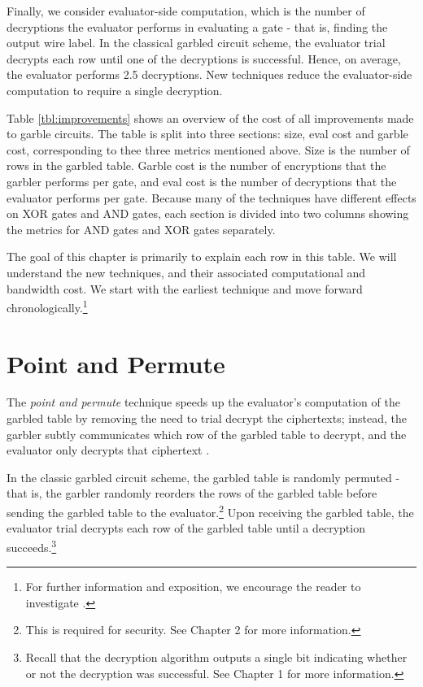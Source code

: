 Finally, we consider evaluator-side computation, which is the number of decryptions the evaluator performs in evaluating a gate - that is, finding the output wire label.
In the classical garbled circuit scheme, the evaluator trial decrypts each row until one of the decryptions is successful.
Hence, on average, the evaluator performs 2.5 decryptions.
New techniques reduce the evaluator-side computation to require a single decryption.



Table \ref{tbl:improvements} shows an overview of the cost of all improvements made to garble circuits.
The table is split into three sections: size, eval cost and garble cost, corresponding to thee three metrics mentioned above.
Size is the number of rows in the garbled table.
Garble cost is the number of encryptions that the garbler performs per gate, and eval cost is the number of decryptions that the evaluator performs per gate. 
Because many of the techniques have different effects on XOR gates and AND gates, each section is divided into two columns showing the metrics for AND gates and XOR gates separately.

The goal of this chapter is primarily to explain each row in this table.
We will understand the new techniques, and their associated computational and bandwidth cost.
We start with the earliest technique and move forward chronologically.\footnote{For further information and exposition, we encourage the reader to investigate \cite{mikes-video}.}

\section{Point and Permute}
The \textit{point and permute} technique speeds up the evaluator's computation of the garbled table by removing the need to trial decrypt the ciphertexts; instead, the garbler subtly communicates which row of the garbled table to decrypt, and the evaluator only decrypts that ciphertext \cite{fairplay}.

In the classic garbled circuit scheme, the garbled table is randomly permuted - that is, the garbler randomly reorders the rows of the garbled table before sending the garbled table to the evaluator.\footnote{This is required for security. See Chapter 2 for more information.}
Upon receiving the garbled table, the evaluator trial decrypts each row of the garbled table until a decryption succeeds.\footnote{Recall that the decryption algorithm outputs a single bit indicating whether or not the decryption was successful. See Chapter 1 for more information.}

